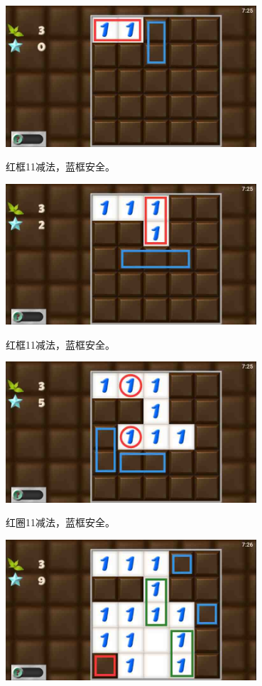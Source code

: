 \subsection{} %
\begin{center}
    \includegraphics[width=0.7\textwidth]{puzzlelow/5-1.jpg}
\end{center}
红框11减法，蓝框安全。
\begin{center}
    \includegraphics[width=0.7\textwidth]{puzzlelow/5-2.jpg}
\end{center}
红框11减法，蓝框安全。
\begin{center}
    \includegraphics[width=0.7\textwidth]{puzzlelow/5-3.jpg}
\end{center}
红圈11减法，蓝框安全。
\begin{center}
    \includegraphics[width=0.7\textwidth]{puzzlelow/5-4.jpg}
\end{center}
